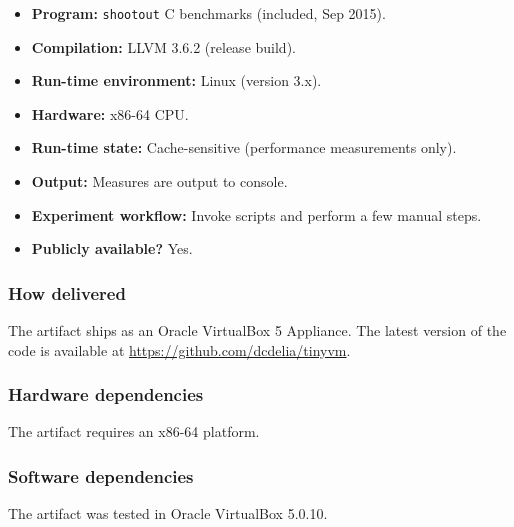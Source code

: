 \documentclass{sigplanconf}
\begin{document}
{\small
\begin{itemize}
  \item {\bf Program: } {\tt shootout} C benchmarks (included, Sep 2015). %
  \item {\bf Compilation: } LLVM 3.6.2 (release build).
  \item {\bf Run-time environment: } Linux (version 3.x).
  \item {\bf Hardware: } x86-64 CPU.
  \item {\bf Run-time state: } Cache-sensitive (performance measurements only).
  \item {\bf Output: } Measures are output to console.
  \item {\bf Experiment workflow: } Invoke scripts and perform a few manual steps.
  \item {\bf Publicly available?} Yes.
\end{itemize}
}

\subsubsection{How delivered}

The artifact ships as an Oracle VirtualBox 5 Appliance.
The latest version of the code is available at \url{https://github.com/dcdelia/tinyvm}.

\subsubsection{Hardware dependencies}

The artifact requires an x86-64 platform.

\subsubsection{Software dependencies}

The artifact was tested in Oracle VirtualBox 5.0.10. 

\end{document}
